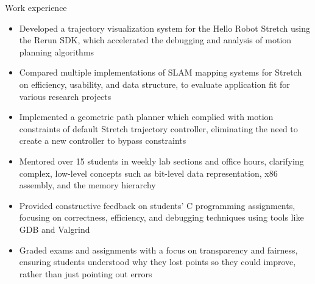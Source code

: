 \documentclass{resume}
\begin{document}
\begin{experienceSection}{Work experience}
    \experienceItem[
        company={Kavraki Computational Robotics Lab},
        location={Houston, TX},
        position={Research Assistant},
        duration={August 2025 – Present}
    ]
    \begin{itemize}
        \vspace{-0.2em}
        \itemsep -6pt
        \item Developed a trajectory visualization system for the Hello Robot Stretch using the Rerun SDK, which accelerated the debugging and analysis of motion planning algorithms
        \item Compared multiple implementations of SLAM mapping systems for Stretch on efficiency, usability, and data structure, to evaluate application fit for various research projects
        \item Implemented a geometric path planner which complied with motion constraints of default Stretch trajectory controller, eliminating the need to create a new controller to bypass constraints
    \end{itemize}
    \experienceItem[
        company={Rice University},
        location={Houston, TX},
        position={Computer Systems Teaching Assistant},
        duration={August 2025 – December 2025}
    ]
    \begin{itemize}
        \vspace{-0.2em}
        \itemsep -6pt
        \item Mentored over 15 students in weekly lab sections and office hours, clarifying complex, low-level concepts such as bit-level data representation, x86 assembly, and the memory hierarchy
        \item Provided constructive feedback on students’ C programming assignments, focusing on correctness, efficiency, and debugging techniques using tools like GDB and Valgrind
        \item Graded exams and assignments with a focus on transparency and fairness, ensuring students understood why they lost points so they could improve, rather than just pointing out errors


\end{itemize}
\end{experienceSection}
\end{document}
